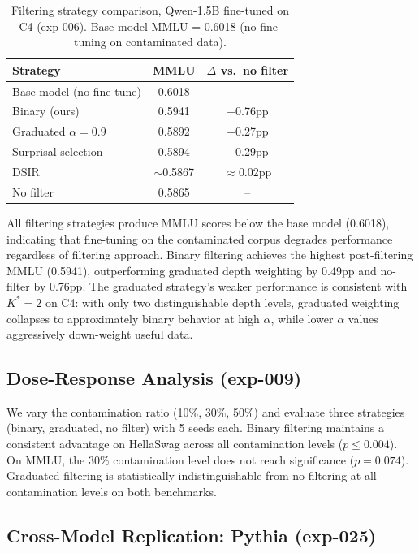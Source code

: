 \documentclass[11pt,a4paper]{article}
\begin{document}
\begin{table}[t]
\centering
\caption{Filtering strategy comparison, Qwen-1.5B fine-tuned on C4 (exp-006). Base model MMLU = 0.6018 (no fine-tuning on contaminated data).}
\label{tab:filtering}
\small
\begin{tabular}{lcc}
\toprule
Strategy & MMLU & $\Delta$ vs.\ no filter \\
\midrule
Base model (no fine-tune) & 0.6018 & -- \\
\midrule
Binary (ours) & 0.5941 & +0.76pp \\
Graduated $\alpha=0.9$ & 0.5892 & +0.27pp \\
Surprisal selection & 0.5894 & +0.29pp \\
DSIR & $\sim$0.5867 & $\approx$0.02pp \\
No filter & 0.5865 & -- \\
\bottomrule
\end{tabular}
\end{table}

All filtering strategies produce MMLU scores below the base model (0.6018), indicating that fine-tuning on the contaminated corpus degrades performance regardless of filtering approach. Binary filtering achieves the highest post-filtering MMLU (0.5941), outperforming graduated depth weighting by 0.49pp and no-filter by 0.76pp. The graduated strategy's weaker performance is consistent with $K^* = 2$ on C4: with only two distinguishable depth levels, graduated weighting collapses to approximately binary behavior at high $\alpha$, while lower $\alpha$ values aggressively down-weight useful data.

\subsection{Dose-Response Analysis (exp-009)}

We vary the contamination ratio (10\%, 30\%, 50\%) and evaluate three strategies (binary, graduated, no filter) with 5 seeds each. Binary filtering maintains a consistent advantage on HellaSwag across all contamination levels ($p \leq 0.004$). On MMLU, the 30\% contamination level does not reach significance ($p = 0.074$). Graduated filtering is statistically indistinguishable from no filtering at all contamination levels on both benchmarks.

\subsection{Cross-Model Replication: Pythia (exp-025)}
\end{document}
